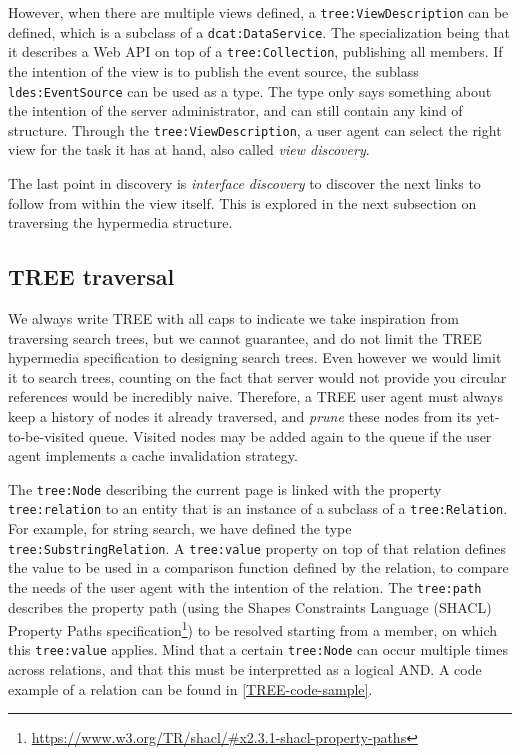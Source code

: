 \documentclass[
]{ceurart}
\begin{document}
However, when there are multiple views defined, a \texttt{tree:ViewDescription} can be defined, which is a subclass of a \texttt{dcat:DataService}.
The specialization being that it describes a Web API on top of a \texttt{tree:Collection}, publishing all members.
If the intention of the view is to publish the event source, the sublass \texttt{ldes:EventSource} can be used as a type.
The type only says something about the intention of the server administrator, and can still contain any kind of structure.
Through the \texttt{tree:ViewDescription}, a user agent can select the right view for the task it has at hand, also called \textit{view discovery}.

The last point in discovery is \textit{interface discovery} to discover the next links to follow from within the view itself.
This is explored in the next subsection on traversing the hypermedia structure.

\subsection{TREE traversal}

We always write TREE with all caps to indicate we take inspiration from traversing search trees, but we cannot guarantee, and do not limit the TREE hypermedia specification to designing search trees.
Even however we would limit it to search trees, counting on the fact that server would not provide you circular references would be incredibly naive.
Therefore, a TREE user agent must always keep a history of nodes it already traversed, and \textit{prune} these nodes from its yet-to-be-visited queue.
Visited nodes may be added again to the queue if the user agent implements a cache invalidation strategy.

The \texttt{tree:Node} describing the current page is linked with the property \texttt{tree:relation} to an entity that is an instance of a subclass of a \texttt{tree:Relation}.
For example, for string search, we have defined the type \texttt{tree:SubstringRelation}.
A \texttt{tree:value} property on top of that relation defines the value to be used in a comparison function defined by the relation, to compare the needs of the user agent with the intention of the relation.
The \texttt{tree:path} describes the property path (using the Shapes Constraints Language (SHACL) Property Paths specification\footnote{\url{https://www.w3.org/TR/shacl/#x2.3.1-shacl-property-paths}}) to be resolved starting from a member, on which this \texttt{tree:value} applies.
Mind that a certain \texttt{tree:Node} can occur multiple times across relations, and that this must be interpretted as a logical AND.
A code example of a relation can be found in \cref{TREE-code-sample}.
\end{document}
